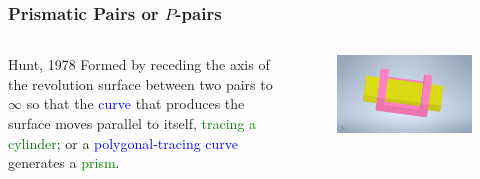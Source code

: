 \begin{frame}
	\frametitle{Prismatic Pairs or $P$-pairs}
	\begin{columns}[t]	
	\begin{column}{.56\textwidth}
		\begin{block}{Hunt, 1978}
		{Formed by receding the axis of the revolution surface between two pairs to $\infty$ so that the \textcolor{blue}{curve} that produces the surface moves parallel to itself, \textcolor{green}{tracing a cylinder}; or a \textcolor{blue}{polygonal-tracing curve} generates a \textcolor{green}{prism}.}
		\end{block}
	\end{column}
		
	\begin{column}{.45\textwidth}
		\begin{figure}
			\centering
			\includegraphics[width=\textwidth]{../Notes/figures/prismatic_joint.pdf}
		\end{figure}
	\end{column}
	\end{columns}
\end{frame}

